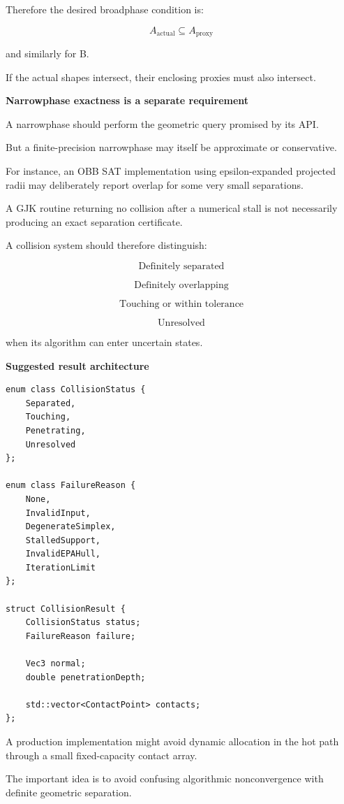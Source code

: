 Therefore the desired broadphase condition is:

\[
\boxed{ A_{\mathrm{actual}}\subseteq A_{\mathrm{proxy}} }
\]

and similarly for B.

If the actual shapes intersect, their enclosing proxies must also intersect.

\textbf{Narrowphase exactness is a separate requirement}

A narrowphase should perform the geometric query promised by its API.

But a finite-precision narrowphase may itself be approximate or conservative.

For instance, an OBB SAT implementation using epsilon-expanded projected radii may deliberately report overlap for some very small separations.

A GJK routine returning no collision after a numerical stall is not necessarily producing an exact separation certificate.

A collision system should therefore distinguish:

\[
\text{Definitely separated}
\]

\[
\text{Definitely overlapping}
\]

\[
\text{Touching or within tolerance}
\]

\[
\text{Unresolved}
\]

when its algorithm can enter uncertain states.

\textbf{Suggested result architecture}

\begin{verbatim}
enum class CollisionStatus {
    Separated,
    Touching,
    Penetrating,
    Unresolved
};

enum class FailureReason {
    None,
    InvalidInput,
    DegenerateSimplex,
    StalledSupport,
    InvalidEPAHull,
    IterationLimit
};

struct CollisionResult {
    CollisionStatus status;
    FailureReason failure;

    Vec3 normal;
    double penetrationDepth;

    std::vector<ContactPoint> contacts;
};
\end{verbatim}

A production implementation might avoid dynamic allocation in the hot path through a small fixed-capacity contact array.

The important idea is to avoid confusing algorithmic nonconvergence with definite geometric separation.

